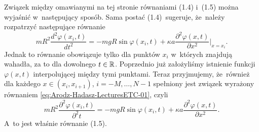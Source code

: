\documentclass[a4paper,11pt]{article}
\begin{document}
\begin{center}
\end{center}

\vspace{\spaceTwo}











\newpage


\vspace{0em}



\vspace{0em}


\noindent
{} Związek między omawianymi na tej stronie równaniami
(1.4) i~(1.5) można wyjaśnić w~następujący sposób. Sama postać
(1.4)~sugeruje, że~należy rozpatrzyć następujące równanie
\begin{equation}
  \label{eq:Arodz-Hadasz-LecturesETC-01}
  m R^{ 2 } \frac{ d^{ 2 } \varphi( x_{ i }, t ) }{ dt^{ 2 } } =
  -m g R \sin \varphi( x_{ i }, t )
  + \kappa a \frac{ \partial^{ 2 } \varphi( x, t ) }{ \partial x^{ 2 } }\bigg|_{ x = x_{ i } }.
\end{equation}
Jednak to równanie obowiązuje tylko dla punktów $x_{ i }$ w~których
znajdują wahadła, za to dla dowolnego $t \in \mathbb{R}$. Poprzednio już
założyliśmy istnienie funkcji $\varphi( x , t )$ interpolującej między
tymi punktami. Teraz przyjmujemy, że~również dla każdego
$x \in ( x_{ i }, x_{ i + 1 } )$, $i = -M, \ldots, N - 1$ spełniony jest
związek wyrażony równaniem \eqref{eq:Arodz-Hadasz-LecturesETC-01}, czyli
\begin{equation}
  \label{eq:Arodz-Hadasz-LecturesETC-02}
  m R^{ 2 } \frac{ \partial^{ 2 } \varphi( x_{ i }, t ) }{ \partial^{ 2 } t } =
  -m g R \sin \varphi( x_{ i }, t )
  + \kappa a \frac{ \partial^{ 2 } \varphi( x, t ) }{ \partial x^{ 2 } }.
\end{equation}
A~to jest właśnie równanie (1.5).




\newpage

\end{document}

